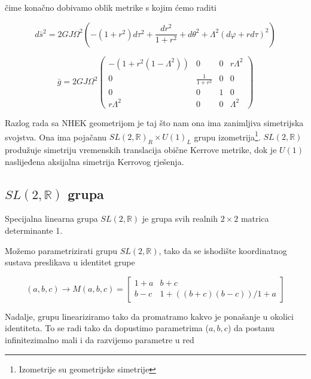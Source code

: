 \noindent čime konačno dobivamo oblik metrike s kojim ćemo raditi

\begin{equation}
d\bar{s}^2=2GJ\Omega^2\left(-(1+r^2)d\tau^2+\frac{dr^2}{1+r^2}+d\theta^2+\Lambda^2(d\varphi+rd\tau)^2\right)
\label{eq:NHEKlinel}
\end{equation}

\begin{equation}
\bar{g}=2GJ\Omega^2
 \begin{pmatrix}
  -(1+r^2(1-\Lambda^2)) & 0 & 0 & r\Lambda^2 \\
  0 & \frac{1}{1+r^2} & 0 & 0 \\
  0 & 0  & 1 & 0  \\
  r\Lambda^2 & 0 & 0 & \Lambda^2
 \end{pmatrix}
 \label{eq:NHEKmet}
\end{equation}

Razlog rada sa NHEK geometrijom je taj što nam ona ima zanimljiva simetrijska svojstva. Ona ima pojačanu $SL(2,\mathbb{R})_R\times U(1)_L$ grupu izometrija\footnote{Izometrije su geometrijske simetrije}. $SL(2,\mathbb{R})$ produžuje simetriju vremenskih translacija obične Kerrove metrike, dok je $U(1)$ naslijeđena aksijalna simetrija Kerrovog rješenja.

\newpage 

\subsection{$SL(2,\mathbb{R})$ grupa}

\begin{mydef*}
Specijalna linearna grupa $SL(2,\mathbb{R})$ je grupa svih realnih $2\times 2$  matrica determinante 1.
\end{mydef*}

\noindent Možemo parametrizirati grupu $SL(2,\mathbb{R})$, tako da se ishodište koordinatnog sustava preslikava u identitet grupe

\begin{equation*}
(a,b,c)\to M(a,b,c)=\begin{bmatrix}
1+a & b+c \\
b-c & 1+((b+c)(b-c))/1+a
\end{bmatrix}
\end{equation*}

\noindent Nadalje, grupu lineariziramo tako da promatramo kakvo je ponašanje u okolici identiteta. To se radi tako da dopustimo parametrima ($a,b,c$) da postanu infinitezimalno mali i da razvijemo parametre u red

